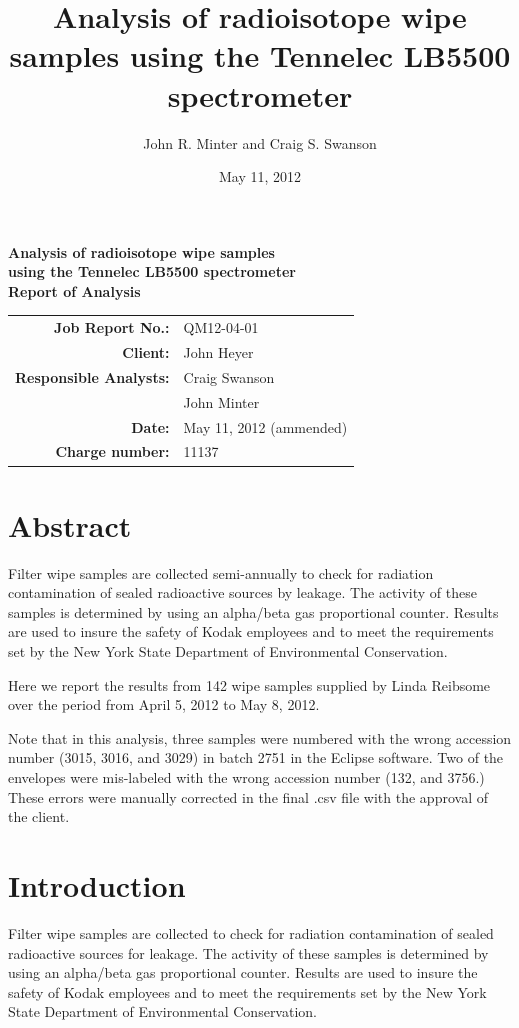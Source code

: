 \documentclass[letterpaper,12pt]{article}
\title{Analysis of radioisotope wipe samples using the Tennelec LB5500 spectrometer}
\author{John R. Minter and Craig S. Swanson}
\date{May 11, 2012}
\begin{document}
\begin{center}
\Large{
\textbf{
Analysis of radioisotope wipe samples \\
using the Tennelec LB5500 spectrometer \\
Report of Analysis}
}
\vskip 0.125in
\normalsize{
   \begin{tabular}{r l}
   \textbf{Job Report No.:}       & QM12-04-01 \\
   \textbf{Client:}               & John Heyer  \\
   \textbf{Responsible Analysts:} & Craig Swanson  \\
                                  & John Minter \\                        
   \textbf{Date:}                 & May 11, 2012 (ammended)  \\
   \textbf{Charge number:}        & 11137  \\
   \end{tabular}
}
\end{center}

\section*{Abstract}
Filter wipe samples are collected semi-annually to check
for radiation contamination of sealed radioactive sources by
leakage. The activity of these samples is determined by using
an alpha/beta gas proportional counter. Results are used to
insure the safety of Kodak employees and to meet the requirements
set by the New York State Department of Environmental
Conservation.

Here we report the results from 142 wipe samples supplied
by Linda Reibsome over the period from April 5, 2012 to May 8, 2012.

Note that in this analysis, three samples were numbered with the wrong
accession number (3015, 3016, and 3029)  in batch 2751 in the Eclipse
software. Two of the envelopes were mis-labeled with the wrong accession
number (132, and 3756.) These errors were manually corrected in the final
.csv file with the approval of the client.


\section*{Introduction}
Filter wipe samples are collected to check for radiation
contamination of sealed radioactive sources for leakage.
The activity of these samples is determined by using an
alpha/beta gas proportional counter. Results are used to
insure the safety of Kodak employees and to meet the requirements
set by the New York State Department of Environmental
Conservation. 
\end{document}
